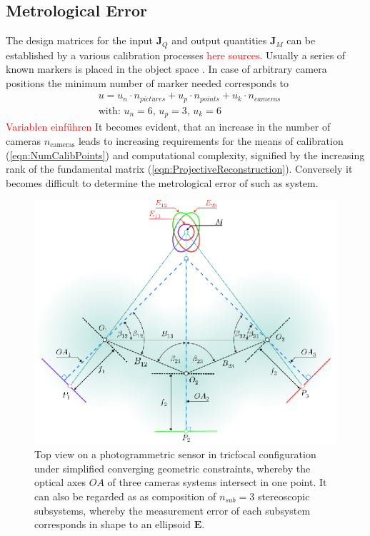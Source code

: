 \documentclass[5p,times,procedia]{elsarticle}
\begin{document}
\subsection{Metrological Error}
\label{error_estimate}
%
The design matrices for the input $\mathbf{J}_{Q}$ and output quantities $\mathbf{J}_{M}$ can be established by a various calibration processes \textcolor{red}{here sources}. Usually a series of known markers is placed in the object space \cite{Luhmann2003}. In case of arbitrary camera positions the minimum number of marker needed corresponds to
\begin{equation}
	\label{eqn:NumCalibPoints}
	\begin{aligned}
		& 	u = u_n \cdot n_{pictures} + u_p \cdot n_{points} + u_k \cdot n_{cameras} \\
		& \text{with: } u_n = 6\text{, } u_p = 3\text{, } u_k = 6 
	\end{aligned}
\end{equation}
\textcolor{red}{Variablen einführen}
It becomes evident, that an increase in the number of cameras $n_{\text{cameras}}$ leads to increasing requirements for the means of calibration (\ref{eqn:NumCalibPoints}) and computational complexity, signified by the increasing rank of the fundamental matrix (\ref{eqn:ProjectiveReconstruction}). Conversely it becomes difficult to determine the metrological error of such as system.\\
%
\begin{figure}[h]
	\centering
	\includegraphics[width=0.8\linewidth]{graphics/MixedErrorCuttingGeometry.eps}
	\caption{Top view on a photogrammetric sensor in tricfocal configuration under simplified converging geometric constraints, whereby the optical axes $OA$ of three cameras systems intersect in one point.		
	It can also be regarded as as composition of $n_{sub}=3$ stereoscopic subsystems, whereby the measurement error of each subsystem corresponds in shape to an ellipsoid $\mathbf{E}$.}
	\label{fig:sub_sensors}
\end{figure}
\end{document}
